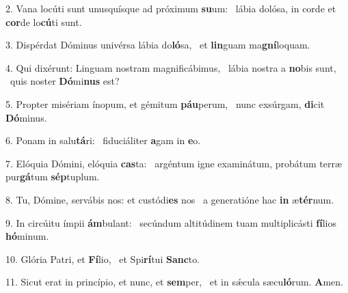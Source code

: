 2. Vana locúti sunt unusquísque ad próximum \textbf{su}um: \ast\  lábia dolósa, in corde et \textbf{cor}de lo\textbf{cú}ti sunt.\

3. Dispérdat Dóminus univérsa lábia do\textbf{ló}sa, \ast\  et \textbf{lin}guam ma\textbf{gní}loquam.\

4. Qui dixérunt: Linguam nostram magnificábimus, \dag\  lábia nostra a \textbf{no}bis sunt, \ast\  quis noster \textbf{Dó}mi\textbf{nus} est?\

5. Propter misériam ínopum, et gémitum \textbf{páu}perum, \ast\  nunc exsúrgam, \textbf{di}cit \textbf{Dó}minus.\

6. Ponam in salu\textbf{tá}ri: \ast\  fiduciáliter \textbf{a}gam in \textbf{e}o.\

7. Elóquia Dómini, elóquia \textbf{cas}ta: \ast\  argéntum igne examinátum, probátum terræ pur\textbf{gá}tum \textbf{sép}tuplum.\

8. Tu, Dómine, servábis nos: et custódi\textbf{es} nos \ast\  a generatióne hac \textbf{in} æ\textbf{tér}num.\

9. In circúitu ímpii \textbf{ám}bulant: \ast\  secúndum altitúdinem tuam multiplicásti \textbf{fí}lios \textbf{hó}minum.\

10. Glória Patri, et \textbf{Fí}lio, \ast\  et Spi\textbf{rí}tui \textbf{Sanc}to.\

11. Sicut erat in princípio, et nunc, et \textbf{sem}per, \ast\  et in sǽcula sæcu\textbf{ló}rum. \textbf{A}men.\

